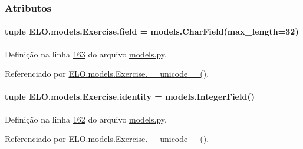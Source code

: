 \subsubsection{Atributos}
\hypertarget{classELO_1_1models_1_1Exercise_a4567f8aa62747a0eabb1c89ab18ec1ce}{}
\paragraph[{field}]{\setlength{\rightskip}{0pt plus 5cm}tuple E\+L\+O.\+models.\+Exercise.\+field = models.\+Char\+Field(max\+\_\+length=32)\hspace{0.3cm}{\ttfamily [static]}}\label{classELO_1_1models_1_1Exercise_a4567f8aa62747a0eabb1c89ab18ec1ce}


Definição na linha \hyperlink{ELO_2models_8py_source_l00163}{163} do arquivo \hyperlink{ELO_2models_8py_source}{models.\+py}.



Referenciado por \hyperlink{classELO_1_1models_1_1Exercise_a23f81c66e4d6bc5a4582d74d191f5117}{E\+L\+O.\+models.\+Exercise.\+\_\+\+\_\+unicode\+\_\+\+\_\+()}.

\hypertarget{classELO_1_1models_1_1Exercise_a0b63268e129a279de260ad21060a1b55}{}
\paragraph[{identity}]{\setlength{\rightskip}{0pt plus 5cm}tuple E\+L\+O.\+models.\+Exercise.\+identity = models.\+Integer\+Field()\hspace{0.3cm}{\ttfamily [static]}}\label{classELO_1_1models_1_1Exercise_a0b63268e129a279de260ad21060a1b55}


Definição na linha \hyperlink{ELO_2models_8py_source_l00162}{162} do arquivo \hyperlink{ELO_2models_8py_source}{models.\+py}.



Referenciado por \hyperlink{classELO_1_1models_1_1Exercise_a23f81c66e4d6bc5a4582d74d191f5117}{E\+L\+O.\+models.\+Exercise.\+\_\+\+\_\+unicode\+\_\+\+\_\+()}.

\hypertarget{classELO_1_1models_1_1Exercise_ae4d0d7ecfe0004385c031cbba76f3b4d}{}

